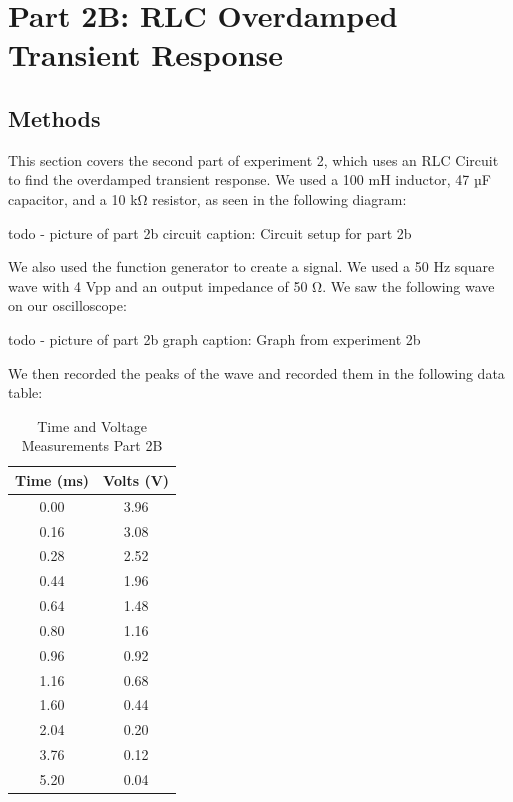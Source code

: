 \documentclass[11pt]{article}
\let\oldsection\section
\renewcommand\section{\clearpage\oldsection}
\begin{document}
    \section{Part 2B: RLC Overdamped Transient Response}\label{sec:part2b_overdamped}
    \subsection{Methods}\label{subsec:part2b_methods}
    This section covers the second part of experiment 2, which uses an RLC Circuit to find the overdamped transient response. We used a 100 mH inductor, 47 µF capacitor, and a 10 kΩ resistor, as seen in the following diagram:

    todo - picture of part 2b circuit
    caption: Circuit setup for part 2b

    We also used the function generator to create a signal. We used a 50 Hz square wave with 4 Vpp and an output impedance of 50 Ω. We saw the following wave on our oscilloscope:

    todo - picture of part 2b graph
    caption: Graph from experiment 2b

    We then recorded the peaks of the wave and recorded them in the following data table:

    \begin{table}[h]
        \centering
        \caption{Time and Voltage Measurements Part 2B}
        \begin{tabular}{cc}
            \toprule
            \textbf{Time (ms)} & \textbf{Volts (V)} \\
            \midrule
            0.00 & 3.96 \\
            0.16 & 3.08 \\
            0.28 & 2.52 \\
            0.44 & 1.96 \\
            0.64 & 1.48 \\
            0.80 & 1.16 \\
            0.96 & 0.92 \\
            1.16 & 0.68 \\
            1.60 & 0.44 \\
            2.04 & 0.20 \\
            3.76 & 0.12 \\
            5.20 & 0.04 \\
            \bottomrule
        \end{tabular}
    \end{table}
\end{document}
